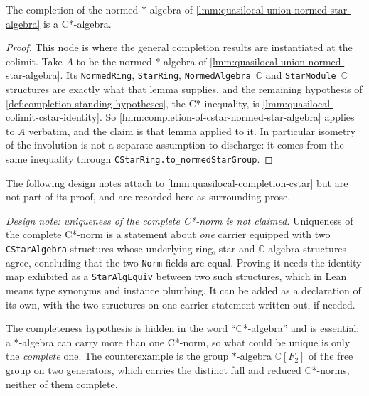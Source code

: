 \begin{lemma}
    \label{lmm:quasilocal-completion-cstar}
    \leanok
    The completion of the normed $*$-algebra of \ref{lmm:quasilocal-union-normed-star-algebra} is a C*-algebra.
\end{lemma}
\begin{proof}
    \leanok
    This node is where the general completion results are instantiated at the colimit. Take $A$ to be the normed $*$-algebra of \ref{lmm:quasilocal-union-normed-star-algebra}. Its \texttt{NormedRing}, \texttt{StarRing}, \texttt{NormedAlgebra \ensuremath{\mathbb{C}}} and \texttt{StarModule \ensuremath{\mathbb{C}}} structures are exactly what that lemma supplies, and the remaining hypothesis of \ref{def:completion-standing-hypotheses}, the C*-inequality, is \ref{lmm:quasilocal-colimit-cstar-identity}. So \ref{lmm:completion-of-cstar-normed-star-algebra} applies to $A$ verbatim, and the claim is that lemma applied to it. In particular isometry of the involution is not a separate assumption to discharge: it comes from the same inequality through \texttt{CStarRing.to\_normedStarGroup}.
\end{proof}

The following design notes attach to \ref{lmm:quasilocal-completion-cstar} but are not part of its proof, and are recorded here as surrounding prose.

\emph{Design note: uniqueness of the complete C*-norm is not claimed.} Uniqueness of the complete C*-norm is a statement about \emph{one} carrier equipped with two \texttt{CStarAlgebra} structures whose underlying ring, star and $\mathbb{C}$-algebra structures agree, concluding that the two \texttt{Norm} fields are equal. Proving it needs the identity map exhibited as a \texttt{StarAlgEquiv} between two such structures, which in Lean means type synonyms and instance plumbing. It can be added as a declaration of its own, with the two-structures-on-one-carrier statement written out, if needed.

The completeness hypothesis is hidden in the word ``C*-algebra'' and is essential: a $*$-algebra can carry more than one C*-norm, so what could be unique is only the \emph{complete} one. The counterexample is the group $*$-algebra $\mathbb{C}[F_2]$ of the free group on two generators, which carries the distinct full and reduced C*-norms, neither of them complete.

